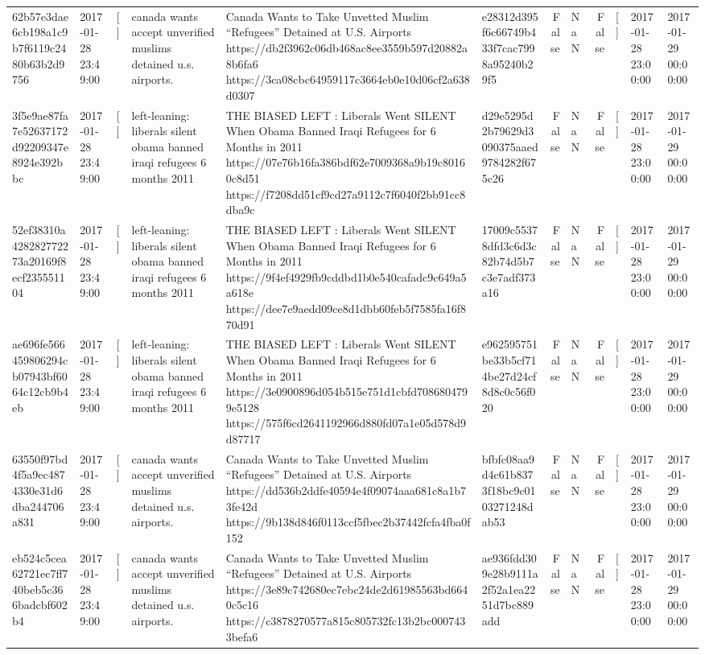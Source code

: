 \begin{tabular}{llllllrlrlll}
62b57e3dae6cb198a1c9b7f6119c2480b63b2d9756 & 2017-01-28 23:49:00 & [] & canada wants accept unverified muslims detained u.s. airports. & Canada Wants to Take Unvetted Muslim “Refugees” Detained at U.S. Airports https://db2f3962c06db468ac8ee3559b597d20882a8b6fa6 https://3ca08cbc64959117c3664eb0e10d06cf2a638d0307 & e28312d395f6c66749b433f7cac7998a95240b29f5 & False & NaN & False & [] & 2017-01-28 23:00:00 & 2017-01-29 00:00:00 \\
3f5e9ae87fa7e52637172d92209347e8924e392bbc & 2017-01-28 23:49:00 & [] & left-leaning: liberals silent obama banned iraqi refugees 6 months 2011 & THE BIASED LEFT : Liberals Went SILENT When Obama Banned Iraqi Refugees for 6 Months in 2011 https://07e76b16fa386bdf62e7009368a9b19c80160c8d51 https://f7208dd51cf9cd27a9112c7f6040f2bb91cc8dba9c & d29e5295d2b79629d3090375aaed9784282f675c26 & False & NaN & False & [] & 2017-01-28 23:00:00 & 2017-01-29 00:00:00 \\
52ef38310a428282772273a20169f8ecf235551104 & 2017-01-28 23:49:00 & [] & left-leaning: liberals silent obama banned iraqi refugees 6 months 2011 & THE BIASED LEFT : Liberals Went SILENT When Obama Banned Iraqi Refugees for 6 Months in 2011 https://9f4ef4929fb9cddbd1b0e540cafadc9c649a5a618e https://dee7e9aedd09ce8d1dbb60feb5f7585fa16f870d91 & 17009c55378dfd3c6d3c82b74d5b7c3e7adf373a16 & False & NaN & False & [] & 2017-01-28 23:00:00 & 2017-01-29 00:00:00 \\
ae696fe566459806294cb07943bf6064c12cb9b4eb & 2017-01-28 23:49:00 & [] & left-leaning: liberals silent obama banned iraqi refugees 6 months 2011 & THE BIASED LEFT : Liberals Went SILENT When Obama Banned Iraqi Refugees for 6 Months in 2011 https://3e0900896d054b515e751d1cbfd7086804799e5128 https://575f6cd2641192966d880fd07a1e05d578d9d87717 & e962595751be33b5cf714be27d24cf8d8c0c56f020 & False & NaN & False & [] & 2017-01-28 23:00:00 & 2017-01-29 00:00:00 \\
63550f97bd4f5a9ec4874330e31d6dba244706a831 & 2017-01-28 23:49:00 & [] & canada wants accept unverified muslims detained u.s. airports. & Canada Wants to Take Unvetted Muslim “Refugees” Detained at U.S. Airports https://dd536b2ddfe40594e4f09074aaa681c8a1b73fe42d https://9b138d846f0113ccf5fbec2b37442fcfa4fba0f152 & bfbfc08aa9d4c61b8373f18bc9c0103271248dab53 & False & NaN & False & [] & 2017-01-28 23:00:00 & 2017-01-29 00:00:00 \\
eb524c5cea62721ec7ff740beb5c366badcbf602b4 & 2017-01-28 23:49:00 & [] & canada wants accept unverified muslims detained u.s. airports. & Canada Wants to Take Unvetted Muslim “Refugees” Detained at U.S. Airports https://3e89c742680ec7ebc24de2d61985563bd6640c5c16 https://c3878270577a815c805732fc13b2bc0007433befa6 & ae936fdd309e28b9111a2f52a1ea2251d7bc889add & False & NaN & False & [] & 2017-01-28 23:00:00 & 2017-01-29 00:00:00 \\

\end{tabular}
